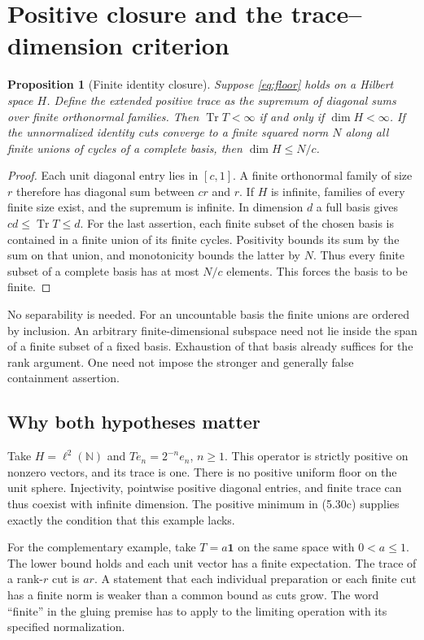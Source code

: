 \documentclass[11pt]{article}
\newcommand{\Tr}{\operatorname{Tr}}
\newcommand{\id}{\mathbf{1}}
\newtheorem{prop}{Proposition}
\newcommand{\parttitle}[2]{\section{#1}}
\begin{document}
\parttitle{Positive closure and the trace--dimension criterion}{The trace argument}\label{sec:trace}
\begin{prop}[Finite identity closure]\label{prop:rank}
Suppose \eqref{eq:floor} holds on a Hilbert space $H$. Define the extended positive trace as the supremum of diagonal sums over finite orthonormal families. Then $\Tr T<\infty$ if and only if $\dim H<\infty$. If the unnormalized identity cuts converge to a finite squared norm $N$ along all finite unions of cycles of a complete basis, then $\dim H\le N/c$.
\end{prop}
\begin{proof}
Each unit diagonal entry lies in $[c,1]$. A finite orthonormal family of size $r$ therefore has diagonal sum between $cr$ and $r$. If $H$ is infinite, families of every finite size exist, and the supremum is infinite. In dimension $d$ a full basis gives $cd\le\Tr T\le d$. For the last assertion, each finite subset of the chosen basis is contained in a finite union of its finite cycles. Positivity bounds its sum by the sum on that union, and monotonicity bounds the latter by $N$. Thus every finite subset of a complete basis has at most $N/c$ elements. This forces the basis to be finite.
\end{proof}

No separability is needed. For an uncountable basis the finite unions are ordered by inclusion. An arbitrary finite-dimensional subspace need not lie inside the span of a finite subset of a fixed basis. Exhaustion of that basis already suffices for the rank argument. One need not impose the stronger and generally false containment assertion.

\subsection{Why both hypotheses matter}
Take $H=\ell^2(\mathbb N)$ and $Te_n=2^{-n}e_n$, $n\ge1$. This operator is strictly positive on nonzero vectors, and its trace is one. There is no positive uniform floor on the unit sphere. Injectivity, pointwise positive diagonal entries, and finite trace can thus coexist with infinite dimension. The positive minimum in (5.30c) supplies exactly the condition that this example lacks.

For the complementary example, take $T=a\id$ on the same space with $0<a\le1$. The lower bound holds and each unit vector has a finite expectation. The trace of a rank-$r$ cut is $ar$. A statement that each individual preparation or each finite cut has a finite norm is weaker than a common bound as cuts grow. The word ``finite'' in the gluing premise has to apply to the limiting operation with its specified normalization.
\end{document}
